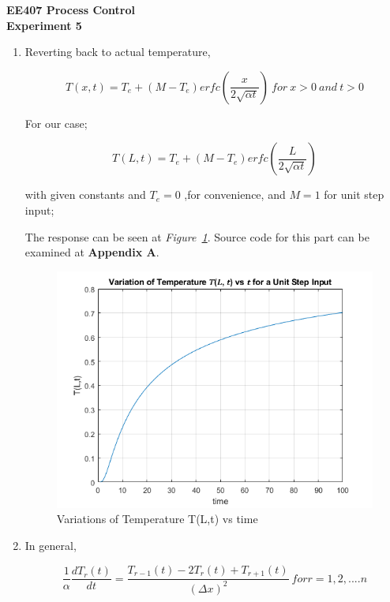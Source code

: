 \documentclass[a4paper,12pt]{article}
\begin{document}
\begin{center}
	\textbf{\large EE407 Process Control \\[0.2cm] Experiment 5} \\
\end{center}


	\begin{enumerate}
		\item Reverting back to actual temperature, 
			
			$$ T(x,t)=T_e+(M-T_e)erfc(\frac{x}{2\sqrt{\alpha t}})\ for\ 𝑥>0\ and\ 𝑡>0$$		
			
			For our case;
			
			$$ T(L,t)=T_e+(M-T_e)erfc(\frac{L}{2\sqrt{\alpha t}}) $$
			
			with given constants and $T_e=0$ ,for convenience, and $M=1$ for unit step input;
			
			The response can be seen at \textit{Figure~\ref{fig:pre1}}. Source code for this part can be examined at \textbf{Appendix A}.
		
			\begin{figure}[H]
				\center
				\setlength{\unitlength}{\textwidth} 
				\includegraphics[width=0.8\unitlength]{images/pre1}
				\caption{\label{fig:pre1} Variations of Temperature T(L,t) vs time }
			\end{figure}
	
			
		\item In general,
		
			$$ \frac{1}{\alpha}\frac{dT_r(t)}{dt}=\frac{T_{r-1}(t)-2T_r(t)+T_{r+1}(t)}{{(\Delta x)}^2}\ for r=1,2, .... n$$
			

\end{enumerate}
\end{document}

